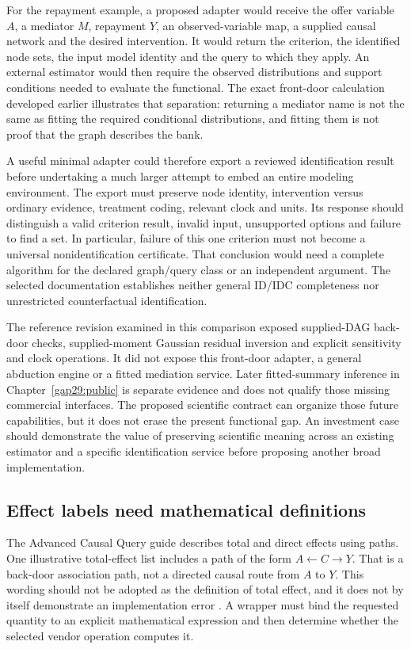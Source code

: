 For the repayment example, a proposed adapter would receive the offer variable
$A$, a mediator $M$, repayment $Y$, an observed-variable map, a supplied causal
network and the desired intervention. It would return the criterion, the
identified node sets, the input model identity and the query to which they
apply. An external estimator would then require the observed distributions
and support conditions needed to evaluate the functional. The exact
front-door calculation developed earlier illustrates that separation:
returning a mediator name is not the same as fitting the required conditional
distributions, and fitting them is not proof that the graph describes the bank.

A useful minimal adapter could therefore export a reviewed identification
result before undertaking a much larger attempt to embed an entire modeling
environment. The export must preserve node identity, intervention versus
ordinary evidence, treatment coding, relevant clock and units. Its response
should distinguish a valid criterion result, invalid input, unsupported
options and failure to find a set. In particular, failure of this one
criterion must not become a universal nonidentification certificate. That
conclusion would need a complete algorithm for the declared graph/query class
or an independent argument. The selected documentation establishes neither
general ID/IDC completeness nor unrestricted counterfactual identification.

The reference revision examined in this comparison exposed supplied-DAG
back-door checks, supplied-moment Gaussian residual inversion and explicit
sensitivity and clock operations. It did not expose this front-door adapter,
a general abduction engine or a fitted mediation service. Later fitted-summary
inference in Chapter~\ref{gap29:public} is separate evidence and does not
qualify those missing commercial interfaces. The proposed
scientific contract can organize those future capabilities, but it does not
erase the present functional gap. An investment case should demonstrate the
value of preserving scientific meaning across an existing estimator and a
specific identification service before proposing another broad implementation. \citep{exec14_ci_comparison}

\subsection{Effect labels need mathematical definitions}

The Advanced Causal Query guide describes total and direct effects using paths.
One illustrative total-effect list includes a path of the form
$A\leftarrow C\rightarrow Y$. That is a back-door association path, not a
directed causal route from $A$ to $Y$. This wording should not be adopted as
the definition of total effect, and it does not by itself demonstrate an
implementation error \citep{exec14_ci_causal_query}. A wrapper must bind the
requested quantity to an explicit mathematical expression and then determine
whether the selected vendor operation computes it.

